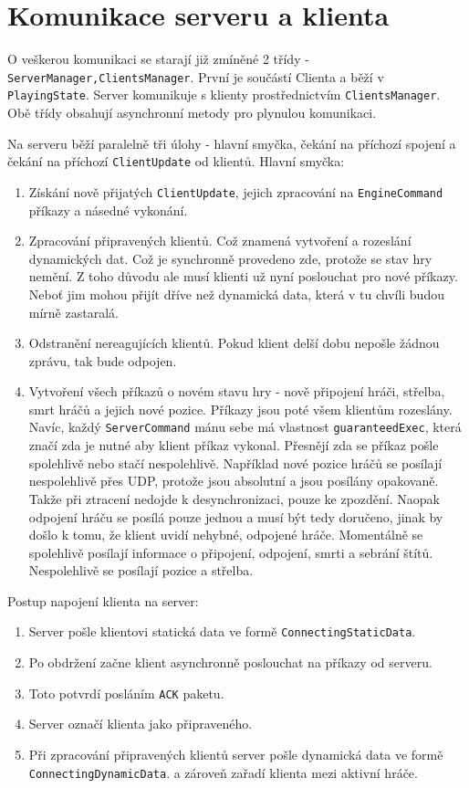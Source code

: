 \documentclass[a4paper,hidelinks]{report}
\begin{document}
\section{Komunikace serveru a klienta}
O veškerou komunikaci se starají již zmíněné 2 třídy - \texttt{ServerManager,ClientsManager}. První je součástí Clienta a běží v \texttt{PlayingState}. Server komunikuje s klienty prostřednictvím \texttt{ClientsManager}. Obě třídy obsahují asynchronní metody pro plynulou komunikaci.

Na serveru běží paralelně tři úlohy - hlavní smyčka, čekání na příchozí spojení a čekání na příchozí \texttt{ClientUpdate} od klientů. Hlavní smyčka:
\begin{enumerate}
	\item Získání nově přijatých \texttt{ClientUpdate}, jejich zpracování na \texttt{EngineCommand} příkazy a násedné vykonání.
	\item Zpracování připravených klientů. Což znamená vytvoření a rozeslání dynamických dat. Což je synchronně provedeno zde, protože se stav hry nemění. Z toho důvodu ale musí klienti už nyní poslouchat pro nové příkazy. Neboť jim mohou přijít dříve než dynamická data, která v tu chvíli budou mírně zastaralá.
	\item Odstranění nereagujících klientů. Pokud klient delší dobu nepošle žádnou zprávu, tak bude odpojen. 
	\item Vytvoření všech příkazů o novém stavu hry - nově připojení hráči, střelba, smrt hráčů a jejich nové pozice. Příkazy jsou poté všem klientům rozeslány. Navíc, každý \texttt{ServerCommand} mánu sebe má vlastnost \texttt{guaranteedExec}, která značí zda je nutné aby klient příkaz vykonal. Přesnějí zda se příkaz pošle spolehlivě nebo stačí nespolehlivě. Například nové pozice hráčů se posílají nespolehlivě přes UDP, protože jsou absolutní a jsou posílány opakovaně. Takže při ztracení nedojde k desynchronizaci, pouze ke zpozdění. Naopak odpojení hráču se posílá pouze jednou a musí být tedy doručeno, jinak by došlo k tomu, že klient uvidí nehybné, odpojené hráče. Momentálně se spolehlivě posílají informace o připojení, odpojení, smrti a sebrání štítů. Nespolehlivě se posílají pozice a střelba.
\end{enumerate}
Postup napojení klienta na server:
\begin{enumerate}
	\item Server pošle klientovi statická data ve formě \texttt{ConnectingStaticData}.
	\item Po obdržení začne klient asynchronně poslouchat na příkazy od serveru.
	\item Toto potvrdí posláním \texttt{ACK} paketu.
	\item Server označí klienta jako připraveného.
	\item Při zpracování připravených klientů server pošle dynamická data ve formě \texttt{ConnectingDynamicData}. a zároveň zařadí klienta mezi aktivní hráče.
\end{enumerate}
\end{document}
